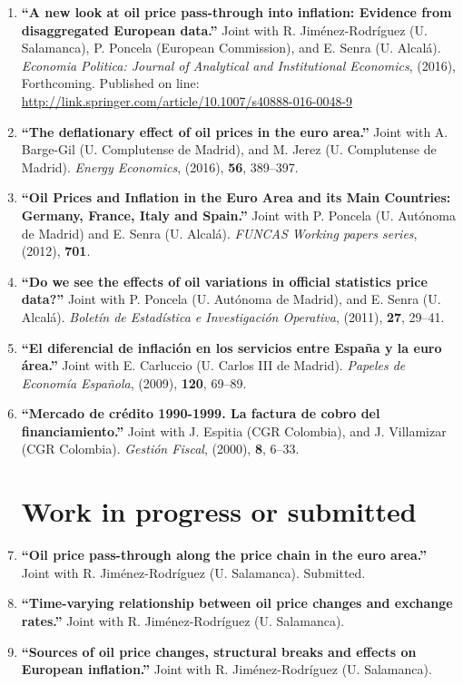 \documentclass[11pt]{article}\usepackage[]{graphicx}\usepackage[]{color}
\begin{document}
\begin{enumerate}
\item \textbf{``A new look at oil price pass-through into inflation: Evidence from disaggregated European data.''} Joint with R. Jiménez-Rodríguez (U. Salamanca), P. Poncela (European Commission), and E. Senra (U. Alcalá). \emph{Economia Politica: Journal of Analytical and Institutional Economics}, (2016), Forthcoming. Published on line: \href{http://link.springer.com/article/10.1007/s40888-016-0048-9}{http://link.springer.com/article/10.1007/s40888-016-0048-9}

\item \textbf{``The deflationary effect of oil prices in the euro area.''} Joint with A. Barge-Gil (U. Complutense de Madrid), and M. Jerez (U. Complutense de Madrid). \emph{Energy Economics}, (2016), \textbf{56}, 389--397.

\item \textbf{``Oil Prices and Inflation in the Euro Area and its Main Countries: Germany, France, Italy and Spain.''} Joint with P. Poncela (U. Autónoma de Madrid) and E. Senra (U. Alcalá). \emph{FUNCAS Working papers series}, (2012), \textbf{701}.

\item \textbf{``Do we see the effects of oil variations in official statistics price data?''} Joint with P. Poncela (U. Autónoma de Madrid), and E. Senra (U. Alcalá). \emph{Boletín de Estadística e Investigación Operativa}, (2011), \textbf{27}, 29--41.

\item \textbf{``El diferencial de inflación en los servicios entre España y la euro área.''} Joint with E. Carluccio (U. Carlos III de Madrid). \emph{Papeles de Economía Española}, (2009), \textbf{120}, 69--89.

\item \textbf{``Mercado de crédito 1990-1999. La factura de cobro del financiamiento.''} Joint with J. Espitia (CGR Colombia), and J. Villamizar (CGR Colombia). \emph{Gestión Fiscal}, (2000), \textbf{8}, 6--33.
\\

\noindent
\section{Work in progress or submitted}

\item \textbf{``Oil price pass-through along the price chain in the euro area.''} Joint with R. Jiménez-Rodríguez (U. Salamanca). Submitted.

\item \textbf{``Time-varying relationship between oil price changes and exchange rates.''} Joint with R. Jiménez-Rodríguez (U. Salamanca).

\item \textbf{``Sources of oil price changes, structural breaks and effects on European inflation.''} Joint with R. Jiménez-Rodríguez (U. Salamanca).
\\
\end{enumerate}
\end{document}
